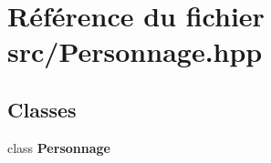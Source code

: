 \section{Référence du fichier src/\-Personnage.hpp}
\label{_personnage_8hpp}
\subsection*{Classes}
\begin{DoxyCompactItemize}
\item 
class {\bf Personnage}
\end{DoxyCompactItemize}
